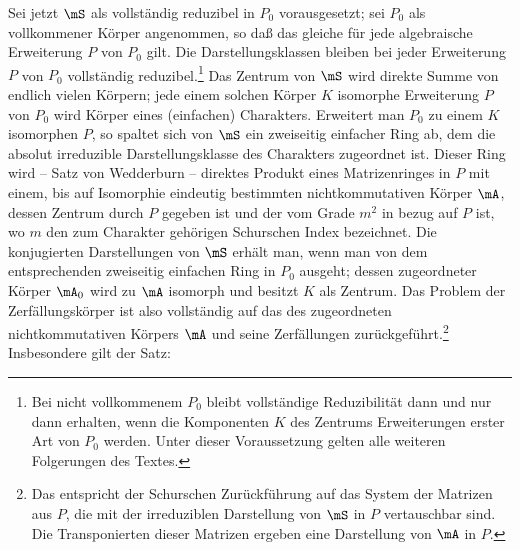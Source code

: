 Sei jetzt $\mS$ als vollständig reduzibel in $P_0$ vorausgesetzt; sei $P_0$ als vollkommener Körper angenommen, so daß das gleiche für jede algebraische Erweiterung $P$ von $P_0$ gilt. Die Darstellungsklassen bleiben bei jeder Erweiterung $P$ von $P_0$ vollständig reduzibel.\footnote{Bei nicht vollkommenem $P_0$ bleibt vollständige Reduzibilität dann und nur dann erhalten, wenn die Komponenten $K$ des Zentrums \guillemotright{}Erweiterungen erster Art\guillemotleft{} von $P_0$ werden. Unter dieser Voraussetzung gelten alle weiteren Folgerungen des Textes.} Das Zentrum von $\mS$ wird direkte Summe von endlich vielen Körpern; jede einem solchen Körper $K$ isomorphe Erweiterung $P$ von $P_0$ wird Körper eines (einfachen) Charakters. Erweitert man $P_0$ zu einem $K$ isomorphen $P$, so spaltet sich von $\mS$ ein zweiseitig einfacher Ring ab, dem die absolut irreduzible Darstellungsklasse des Charakters zugeordnet ist. Dieser Ring wird -- Satz von Wedderburn -- direktes Produkt eines Matrizenringes in $P$ mit einem, bis auf Isomorphie eindeutig bestimmten nichtkommutativen Körper $\mA$, dessen Zentrum durch $P$ gegeben ist und der vom Grade $m^2$ in bezug auf $P$ ist, wo $m$ den zum Charakter gehörigen Schurschen Index bezeichnet.  Die konjugierten Darstellungen von $\mS$ erhält man, wenn man von dem entsprechenden zweiseitig einfachen Ring in $P_0$ ausgeht; dessen zugeordneter Körper $\mA_0$ wird zu $\mA$ isomorph und besitzt $K$ als Zentrum. Das Problem der Zerfällungskörper ist also vollständig auf das des zugeordneten nichtkommutativen Körpers $\mA$ und seine Zerfällungen zurückgeführt.\footnote{Das entspricht der Schurschen Zurückführung auf das System der Matrizen aus $P$, die mit der irreduziblen Darstellung von $\mS$ in $P$ vertauschbar sind. Die Transponierten dieser Matrizen ergeben eine Darstellung von $\mA$ in $P$.} Insbesondere gilt der Satz:
